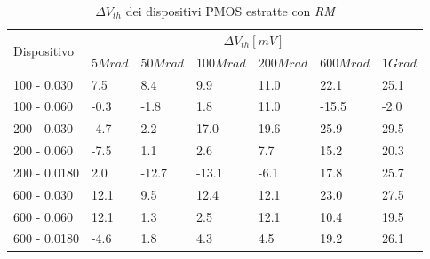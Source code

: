 \documentclass[
	a4paper,
	cleardoublepage=empty,
	headings=twolinechapter,
	numbers=autoenddot,
]{scrbook}
\begin{document}
\begin{table}[H]
  \renewcommand{\arraystretch}{1.3}
  \begin{tabular}{m{2.1cm}  m{1.1cm} m{1.3cm} m{1.5cm} m{1.5cm} m{1.5cm} m{1cm}}
    \toprule
    \multirow{2}{*}{Dispositivo} & \multicolumn{6}{c}{$\Delta V_{th} [mV] $}                                                          \\
    \cmidrule{2-7}
                                 & $5Mrad$                                   & $50Mrad$ & $100Mrad$ & $200Mrad$ & $600Mrad$ & $1Grad$ \\
    \midrule
    100 - 0.030                     & 7.5                                       & 8.4      & 9.9       & 11.0      & 22.1      & 25.1    \\
    \hline
    100 - 0.060                     & -0.3                                      & -1.8     & 1.8       & 11.0      & -15.5     & -2.0    \\
    \hline
    200 - 0.030                     & -4.7                                      & 2.2      & 17.0      & 19.6      & 25.9      & 29.5    \\
    \hline
    200 - 0.060                     & -7.5                                      & 1.1      & 2.6       & 7.7       & 15.2      & 20.3    \\
    \hline
    200 - 0.0180                    & 2.0                                       & -12.7    & -13.1     & -6.1      & 17.8      & 25.7    \\
    \hline
    600 - 0.030                     & 12.1                                      & 9.5      & 12.4      & 12.1      & 23.0      & 27.5    \\
    \hline
    600 - 0.060                     & 12.1                                      & 1.3      & 2.5       & 12.1      & 10.4      & 19.5    \\
    \hline
    600 - 0.0180                    & -4.6                                      & 1.8      & 4.3       & 4.5       & 19.2      & 26.1    \\
    \bottomrule
  \end{tabular}
  \caption{$\Delta V_{th}$ dei dispositivi PMOS estratte con \emph{RM}}
  \label{tab:deltaVthRMP}
\end{table}
\end{document}
